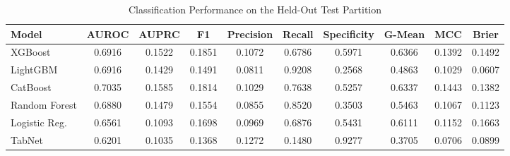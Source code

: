 \begin{table}
\centering
\caption{Classification Performance on the Held-Out Test Partition}
\label{tab:results}
\begin{tabular}{lccccccccc}
\toprule
Model & AUROC & AUPRC & F1 & Precision & Recall & Specificity & G-Mean & MCC & Brier \\
\midrule
XGBoost & 0.6916 & 0.1522 & 0.1851 & 0.1072 & 0.6786 & 0.5971 & 0.6366 & 0.1392 & 0.1492 \\
LightGBM & 0.6916 & 0.1429 & 0.1491 & 0.0811 & 0.9208 & 0.2568 & 0.4863 & 0.1029 & 0.0607 \\
CatBoost & 0.7035 & 0.1585 & 0.1814 & 0.1029 & 0.7638 & 0.5257 & 0.6337 & 0.1443 & 0.1382 \\
Random Forest & 0.6880 & 0.1479 & 0.1554 & 0.0855 & 0.8520 & 0.3503 & 0.5463 & 0.1067 & 0.1123 \\
Logistic Reg. & 0.6561 & 0.1093 & 0.1698 & 0.0969 & 0.6876 & 0.5431 & 0.6111 & 0.1152 & 0.1663 \\
TabNet & 0.6201 & 0.1035 & 0.1368 & 0.1272 & 0.1480 & 0.9277 & 0.3705 & 0.0706 & 0.0899 \\
\bottomrule
\end{tabular}
\end{table}
